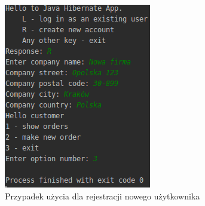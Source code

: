 \documentclass[12pt, a4paper]{mwart}
\begin{document}
\begin{figure}[ht]
  \centering
  \includegraphics[scale=0.7]{XII/12-2.png}
  \caption{Przypadek użycia dla rejestracji nowego użytkownika}
  \label{rys:12.2}
\end{figure}
\end{document}
